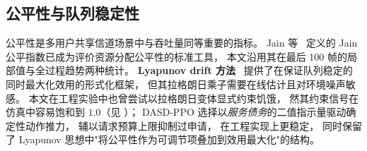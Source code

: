 \subsection{公平性与队列稳定性}

公平性是多用户共享信道场景中与吞吐量同等重要的指标。
Jain 等~\cite{jain1984} 定义的 Jain 公平指数已成为评价资源分配公平性的标准工具，
本文沿用其在最后 100 帧的局部值与全过程趋势两种统计。
\textbf{Lyapunov drift 方法}~\cite{neely2010stochastic} 提供了在保证队列稳定的同时最大化效用的形式化框架，
但其拉格朗日乘子需要在线估计且对环境噪声敏感。
本文在工程实验中也曾尝试以拉格朗日变体显式约束饥饿，
然其约束信号在仿真中容易饱和到 \(1.0\)（见 ）；
DASD-PPO 选择以\emph{服务债务}的二值指示量驱动确定性动作推力，
辅以请求预算上限抑制过申请，
在工程实现上更稳定，
同时保留了 Lyapunov 思想中"将公平性作为可调节项叠加到效用最大化"的结构。
